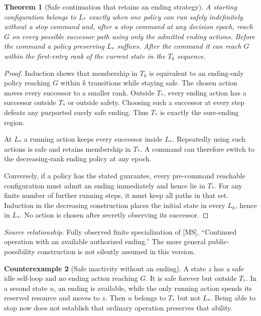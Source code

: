 \documentclass[11pt,oneside,openany]{book}
\newtheorem{theorem}{Theorem}[chapter]
\theoremstyle{definition}\newtheorem{definition}[theorem]{Definition}
\newtheorem{counterexample}[theorem]{Counterexample}
\newcommand{\source}[1]{\par{\small\textit{Source relationship.} #1}\par}
\begin{document}
\begin{theorem}[Safe continuation that retains an ending strategy]\label{r:ending}
A starting configuration belongs to $L_*$ exactly when one policy can run safely indefinitely without a stop command and, after a stop command at any decision epoch, reach $G$ on every possible successor path using only the admitted ending actions. Before the command a policy preserving $L_*$ suffices. After the command it can reach $G$ within the first-entry rank of the current state in the $T_k$ sequence.
\end{theorem}
\begin{proof}
Induction shows that membership in $T_k$ is equivalent to an ending-only policy reaching $G$ within $k$ transitions while staying safe. The chosen action moves every successor to a smaller rank. Outside $T_*$, every ending action has a successor outside $T_*$ or outside safety. Choosing such a successor at every step defeats any purported surely safe ending. Thus $T_*$ is exactly the sure-ending region.

At $L_*$ a running action keeps every successor inside $L_*$. Repeatedly using such actions is safe and retains membership in $T_*$. A command can therefore switch to the decreasing-rank ending policy at any epoch.

Conversely, if a policy has the stated guarantee, every pre-command reachable configuration must admit an ending immediately and hence lie in $T_*$. For any finite number of further running steps, it must keep all paths in that set. Induction in the decreasing construction places the initial state in every $L_k$, hence in $L_*$. No action is chosen after secretly observing its successor.
\end{proof}
\source{Fully observed finite specialization of [MS], ``Continued operation with an available authorized ending.'' The more general public-possibility construction is not silently assumed in this version.}

\begin{counterexample}[Safe inactivity without an ending]\label{ce:ending}
A state $z$ has a safe idle self-loop and no ending action reaching $G$. It is safe forever but outside $T_*$. In a second state $u$, an ending is available, while the only running action spends its reserved resource and moves to $z$. Then $u$ belongs to $T_*$ but not $L_*$. Being able to stop now does not establish that ordinary operation preserves that ability.
\end{counterexample}
\end{document}
